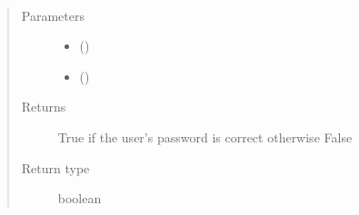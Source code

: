 \documentclass[letterpaper,10pt,english]{sphinxmanual}
\begin{document}
\begin{fulllineitems}
\label{\detokenize{index:controller.utility.correct_password_user}}~\begin{quote}\begin{description}
\item[{Parameters}] \leavevmode\begin{itemize}
\item {} 
 () \textendash{} 

\item {} 
 () \textendash{} 

\end{itemize}

\item[{Returns}] \leavevmode
True if the user’s password is correct otherwise False

\item[{Return type}] \leavevmode
boolean

\end{description}\end{quote}

\end{fulllineitems}

\end{document}
